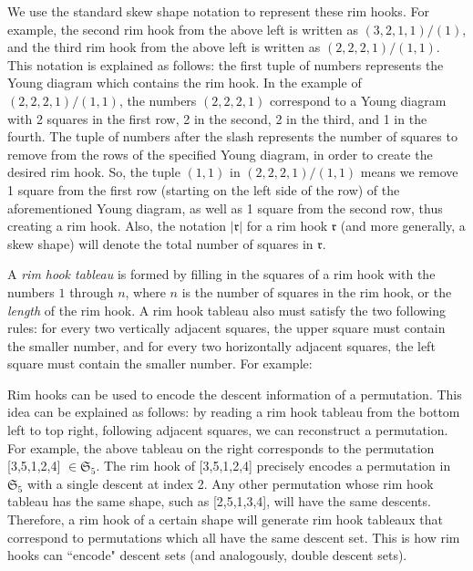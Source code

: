 \documentclass[11pt, a4paper, reqno]{article}
\numberwithin{equation}{section}
\theoremstyle{definition}
\begin{document}
	We use the standard skew shape notation to represent these rim hooks. For example, the second rim hook from the above left is written as $(3,2,1,1)/(1)$, and the third rim hook from the above left is written as $(2,2,2,1)/(1,1)$. This notation is explained as follows: the first tuple of numbers represents the Young diagram which contains the rim hook. In the example of $(2,2,2,1)/(1,1)$, the numbers $(2,2,2,1)$ correspond to a Young diagram with 2 squares in the first row, 2 in the second, 2 in the third, and 1 in the fourth. The tuple of numbers after the slash represents the number of squares to remove from the rows of the specified Young diagram, in order to create the desired rim hook. So, the tuple $(1,1)$ in $(2,2,2,1)/(1,1)$ means we remove 1 square from the first row (starting on the left side of the row) of the aforementioned Young diagram, as well as 1 square from the second row, thus creating a rim hook. Also, the notation $|\mathfrak{r}|$ for a rim hook $\mathfrak{r}$ (and more generally, a skew shape) will denote the total number of squares in $\mathfrak{r}$.
	
	 A \textit{rim hook tableau} is formed by filling in the squares of a rim hook with the numbers $1$ through $n$, where $n$ is the number of squares in the rim hook, or the \textit{length} of the rim hook. A rim hook tableau also must satisfy the two following rules: for every two vertically adjacent squares, the upper square must contain the smaller number, and for every two horizontally adjacent squares, the left square must contain the smaller number. For example:
	\vspace{0.3cm}
	\begin{center}
	           
	\end{center}
	\vspace{0.3cm}
	
	Rim hooks can be used to encode the descent information of a permutation. This idea can be explained as follows: by reading a rim hook tableau from the bottom left to top right, following adjacent squares, we can reconstruct a permutation. For example, the above tableau on the right corresponds to the permutation [3,5,1,2,4] $\in \mathfrak{S}_5$. The rim hook of [3,5,1,2,4] precisely encodes a permutation in $\mathfrak{S}_5$ with a single descent at index 2. Any other permutation whose rim hook tableau has the same shape, such as [2,5,1,3,4], will have the same descents. Therefore, a rim hook of a certain shape will generate rim hook tableaux that correspond to permutations which all have the same descent set. This is how rim hooks can ``encode" descent sets (and analogously, double descent sets).
	
\end{document}
